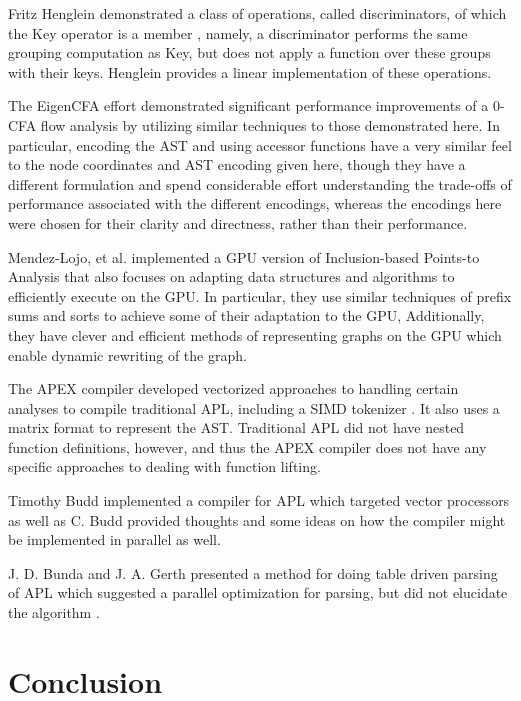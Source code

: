 ﻿\documentclass[numbers,10pt,preprint]{sigplanconf}
\begin{document}
Fritz Henglein demonstrated a class of operations, called discriminators, of which the Key operator is a member \cite{henglein2013dd} , namely, a discriminator performs the same grouping computation as Key, but does not apply a function over these groups with their keys. Henglein provides a linear implementation of these operations.

The EigenCFA effort \cite{prabhu2011eigencfa} demonstrated significant performance improvements of a 0-CFA flow analysis by utilizing similar techniques to those demonstrated here. In particular, encoding the AST and using accessor functions have a very similar feel to the node coordinates and AST encoding given here, though they have a different formulation and spend considerable effort understanding the trade-offs of performance associated with the different encodings, whereas the encodings here were chosen for their clarity and directness, rather than their performance.

Mendez-Lojo, et al. implemented a GPU version of Inclusion-based Points-to Analysis \cite{mendez2012inclusion} that also focuses on adapting data structures and algorithms to efficiently execute on the GPU. In particular, they use similar techniques of prefix sums and sorts to achieve some of their adaptation to the GPU, Additionally, they have clever and efficient methods of representing graphs on the GPU which enable dynamic rewriting of the graph.

The APEX compiler \cite{bernecky1997apex} developed vectorized approaches to handling certain analyses to compile traditional APL, including a SIMD tokenizer \cite{bernecky2003tokenizer}. It also uses a matrix format to represent the AST. Traditional APL did not have nested function definitions, however, and thus the APEX compiler does not have any specific approaches to dealing with function lifting.

Timothy Budd implemented a compiler \cite{budd1984apl,budd2012apl} for APL which targeted vector processors as well as C. Budd provided thoughts and some ideas on how the compiler might be implemented in parallel as well.

J. D. Bunda and J. A. Gerth presented a method for doing table driven parsing of APL which suggested a parallel optimization for parsing, but did not elucidate the algorithm \cite{bunda1984apl}.

\section{Conclusion}
\end{document}
